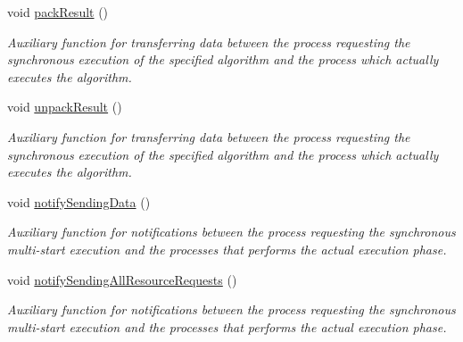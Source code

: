 \begin{CompactItemize}
void \hyperlink{classpeoSyncMultiStart_6c48eb0dae741cff7203b65e226f9616}{pack\-Result} ()
\begin{CompactList}\small\item\em Auxiliary function for transferring data between the process requesting the synchronous execution of the specified algorithm and the process which actually executes the algorithm. \item\end{CompactList}\item 
void \hyperlink{classpeoSyncMultiStart_c3cbd1f10a89d1915c5ccf82a2c34a1d}{unpack\-Result} ()
\begin{CompactList}\small\item\em Auxiliary function for transferring data between the process requesting the synchronous execution of the specified algorithm and the process which actually executes the algorithm. \item\end{CompactList}\item 
void \hyperlink{classpeoSyncMultiStart_32ec0d01d3fd8a9932abd68f4781fc94}{notify\-Sending\-Data} ()
\begin{CompactList}\small\item\em Auxiliary function for notifications between the process requesting the synchronous multi-start execution and the processes that performs the actual execution phase. \item\end{CompactList}\item 
void \hyperlink{classpeoSyncMultiStart_fc90282cc4e93cdea8f82fd52dd78fb0}{notify\-Sending\-All\-Resource\-Requests} ()
\begin{CompactList}\small\item\em Auxiliary function for notifications between the process requesting the synchronous multi-start execution and the processes that performs the actual execution phase. \item\end{CompactList}\end{CompactItemize}
